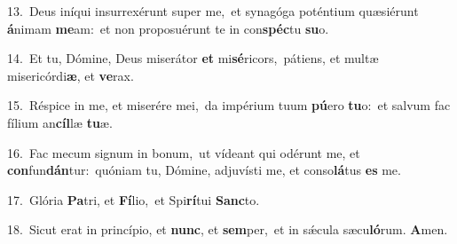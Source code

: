 {\numbfont\textcolor{\numbcolor}{13.}}~Deus iníqui insurrexérunt super me,~\dagger et synagóga poténtium quæsiérunt \textbf{á}\-nimam \textbf{me}\-am:~\star et non proposuérunt te in con\-\textbf{spéc}\-tu \textbf{su}\-o.\par
{\numbfont\textcolor{\numbcolor}{14.}}~Et tu, Dómine, Deus miserátor \textbf{et} mi\-\textbf{sé}\-ricors,~\star pátiens, et multæ misericórdi\-\textbf{æ}\-, et \textbf{ve}\-rax.\par
{\numbfont\textcolor{\numbcolor}{15.}}~Réspice in me, et miserére mei,~\dagger da impérium tuum \textbf{pú}\-ero \textbf{tu}\-o:~\star et salvum fac fílium an\-\textbf{cíl}\-læ \textbf{tu}\-æ.\par
{\numbfont\textcolor{\numbcolor}{16.}}~Fac mecum signum in bonum,~\dagger ut vídeant qui odérunt me, et \textbf{con}\-fun\-\textbf{dán}\-tur:~\star quóniam tu, Dómine, adjuvísti me, et conso\-\textbf{lá}\-tus \textbf{es} me.\par
{\numbfont\textcolor{\numbcolor}{17.}}~Glória \textbf{Pa}\-tri, et \textbf{Fí}\-lio,~\star et Spi\-\textbf{rí}\-tui \textbf{Sanc}\-to.\par
{\numbfont\textcolor{\numbcolor}{18.}}~Sicut erat in princípio, et \textbf{nunc}\-, et \textbf{sem}\-per,~\star et in sǽcula sæcu\-\textbf{ló}\-rum. \textbf{A}\-men.\par
